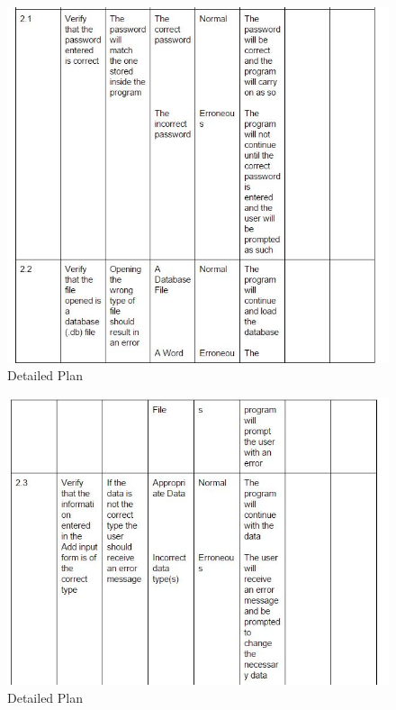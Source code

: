 \begin{itemize}
\begin{figure}[H]
    \includegraphics[width=\textwidth]{DP18.JPG}
    \caption{Detailed Plan} \label{fig:VDetailed Plan}
\end{figure}

\begin{figure}[H]
    \includegraphics[width=\textwidth]{DP19.JPG}
    \caption{Detailed Plan} \label{fig:VDetailed Plan}
\end{figure}


\end{itemize}
